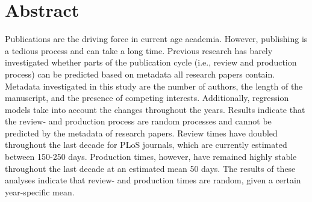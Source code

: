 \section*{Abstract}
Publications are the driving force in current age academia. However, publishing is a tedious process and can take a long time. Previous research has barely investigated whether parts of the publication cycle (i.e., review\- and production process) can be predicted based on metadata all research papers contain. Metadata investigated in this study are the number of authors, the length of the manuscript, and the presence of competing interests. Additionally, regression models take into account the changes throughout the years. Results indicate that the review- and production process are random processes and cannot be predicted by the metadata of research papers. Review times have doubled throughout the last decade for PLoS journals, which are currently estimated between 150-250 days. Production times, however, have remained highly stable throughout the last decade at an estimated mean 50 days. The results of these analyses indicate that review- and production times are random, given a certain year-specific mean. 
  
  
  
  
  
